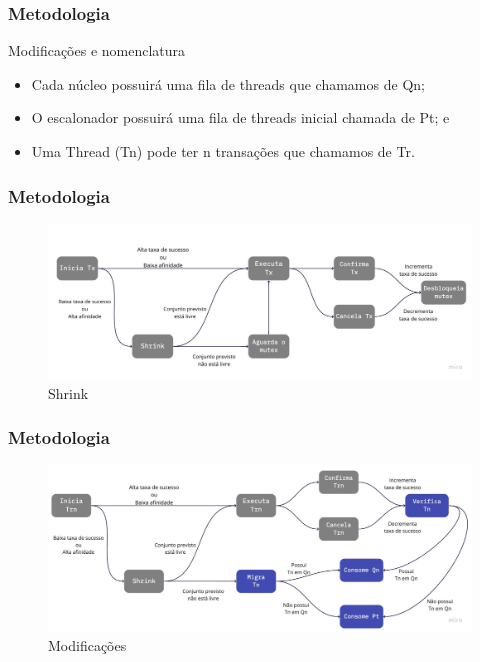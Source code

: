\documentclass[10pt, pdf,xcolor=pdftex,dvipsnames,table]{beamer}
\begin{document}
\begin{frame} \frametitle{Metodologia}
\begin{block}{Modificações e nomenclatura}
\begin{itemize}
	\item Cada núcleo possuirá uma fila de threads que chamamos de Qn;
	\item O escalonador possuirá uma fila de threads inicial chamada de Pt; e
	\item Uma Thread (Tn) pode ter n transações que chamamos de Tr.
\end{itemize}
\end{block}
\end{frame}

\begin{frame} \frametitle{Metodologia}
    \begin{figure}[!h]
	    \includegraphics[scale=0.25]{images/ShrinkFlow}
	    \caption{Shrink}
	    \label{fig:abusy}
    \end{figure}
\end{frame}

\begin{frame} \frametitle{Metodologia}
    \begin{figure}[!h]
	    \includegraphics[scale=0.25]{images/LScheduleFlow}
	    \caption{Modificações}
	    \label{fig:abusy}
    \end{figure}
\end{frame}
\end{document}
